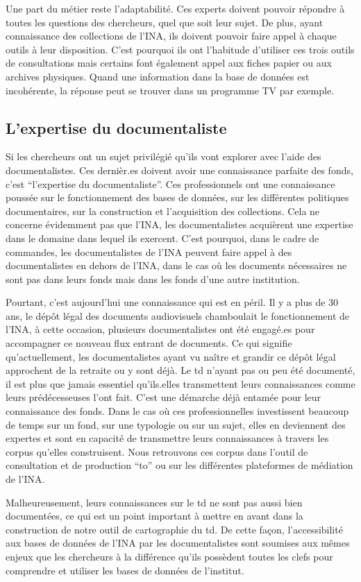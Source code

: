 Une part du métier reste l'adaptabilité. Ces experts doivent pouvoir répondre à toutes les questions des chercheurs, quel que soit leur sujet. De plus, ayant connaissance des collections de l'INA, ils doivent pouvoir faire appel à chaque outils à leur disposition. C'est pourquoi ils ont l'habitude d'utiliser ces trois outils de consultations mais certains font également appel aux fiches papier ou aux archives physiques. Quand une information dans la base de données est incohérente, la réponse peut se trouver dans un programme TV par exemple. 

\subsection{L'expertise du documentaliste}

Si les chercheurs ont un sujet privilégié qu'ils vont explorer avec l'aide des documentalistes. Ces dernièr.es doivent avoir une connaissance parfaite des fonds, c'est \enquote{l'expertise du documentaliste}. Ces professionnels ont une connaissance poussée sur le fonctionnement des bases de données, sur les différentes politiques documentaires, sur la construction et l'acquisition des collections. Cela ne concerne évidemment pas que l'INA, les documentalistes acquièrent une expertise dans le domaine dans lequel ils exercent. C'est pourquoi, dans le cadre de commandes, les documentalistes de l'INA peuvent faire appel à des documentalistes en dehors de l'INA, dans le cas où les documents nécessaires ne sont pas dans leurs fonds mais dans les fonds d'une autre institution.

Pourtant, c'est aujourd'hui une connaissance qui est en péril. Il y a plus de 30 ans, le dépôt légal des documents audiovisuels chamboulait le fonctionnement de l'INA, à cette occasion, plusieurs documentalistes ont été engagé.es pour accompagner ce nouveau flux entrant de documents. Ce qui signifie qu'actuellement, les documentalistes ayant vu naître et grandir ce dépôt légal approchent de la retraite ou y sont déjà. Le \gls{td} n'ayant pas ou peu été documenté, il est plus que jamais essentiel qu'ils.elles transmettent leurs connaissances comme leurs prédécesseuses l'ont fait. C'est une démarche déjà entamée pour leur connaissance des fonds. Dans le cas où ces professionnelles investissent beaucoup de temps sur un fond, sur une typologie ou sur un sujet, elles en deviennent des expertes et sont en capacité de transmettre leurs connaissances à travers les corpus qu'elles construisent. Nous retrouvons ces corpus dans l'outil de consultation et de production \enquote{\gls{to}} ou sur les différentes plateformes de médiation de l'INA. 

Malheureusement, leurs connaissances sur le \gls{td} ne sont pas aussi bien documentées, ce qui est un point important à mettre en avant dans la construction de notre outil de cartographie du \gls{td}. De cette façon, l'accessibilité aux bases de données de l'INA par les documentalistes sont soumises aux mêmes enjeux que les chercheurs à la différence qu'ils possèdent toutes les clefs pour comprendre et utiliser les bases de données de l'institut. 